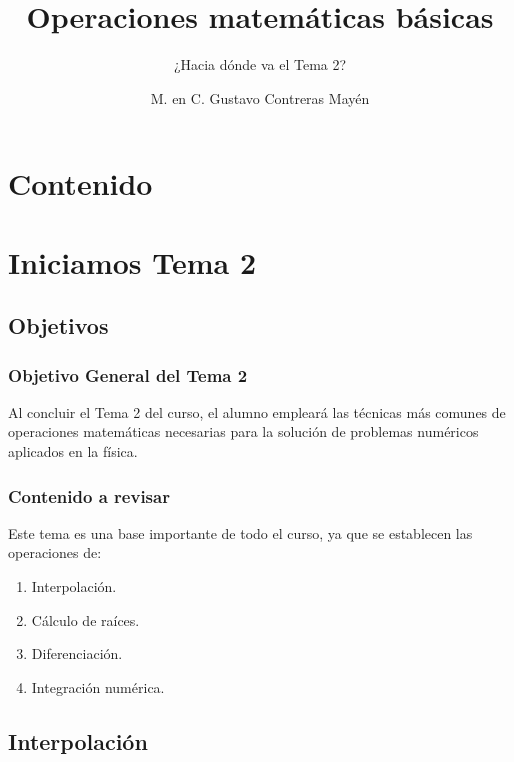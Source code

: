 \documentclass[12pt]{beamer}
\title{\large{Operaciones matemáticas básicas}}
\subtitle{¿Hacia dónde va el Tema 2?}
\author{M. en C. Gustavo Contreras Mayén}
\date{}
\begin{document}
\maketitle

\section*{Contenido}

\section{Iniciamos Tema 2}
\subsection{Objetivos}

\begin{frame}
\frametitle{Objetivo General del Tema 2}
Al concluir el Tema 2 del curso, el alumno empleará las técnicas más comunes de operaciones matemáticas necesarias para la solución de problemas numéricos aplicados en la física.
\end{frame}
\begin{frame}
\frametitle{Contenido a revisar}
Este tema es una base importante de todo el curso, ya que se establecen las operaciones de:
\begin{enumerate}[<+->]
\item Interpolación.
\item Cálculo de raíces.
\item Diferenciación.
\item Integración numérica.
\end{enumerate}
\end{frame}

\subsection{Interpolación}
\end{document}
